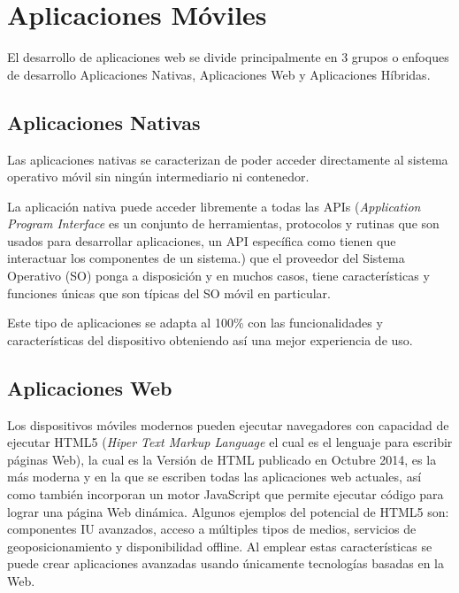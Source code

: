 \section{Aplicaciones Móviles}
\label{cha:aplicaciones_moviles}

  El desarrollo de aplicaciones web se divide principalmente en 3 grupos o enfoques de desarrollo Aplicaciones Nativas, Aplicaciones Web y Aplicaciones Híbridas.

  \subsection{Aplicaciones Nativas}
  \label{sec:aplicaciones_nativas}

  Las aplicaciones nativas se caracterizan de poder acceder directamente al sistema operativo móvil sin ningún intermediario ni contenedor.

  La aplicación nativa puede acceder libremente a todas las APIs (\emph{Application Program Interface} es un conjunto de herramientas, protocolos y rutinas que son usados para desarrollar aplicaciones, un API específica como tienen que interactuar los componentes de un sistema.) que el proveedor del Sistema Operativo (SO) ponga a disposición y en muchos casos, tiene características y funciones únicas que son típicas del SO móvil en particular.

  Este tipo de aplicaciones se adapta al 100\% con las funcionalidades y características del dispositivo obteniendo así una mejor experiencia de uso.


  \subsection{Aplicaciones Web}
  \label{sec:aplicaciones_web}

  Los dispositivos móviles modernos pueden ejecutar navegadores con capacidad de ejecutar HTML5 (\emph{Hiper Text Markup Language} el cual es el lenguaje para escribir páginas Web), la cual es la Versión de HTML publicado en Octubre 2014, es la más moderna y en la que se escriben todas las aplicaciones web actuales, así como también incorporan un motor JavaScript que permite ejecutar código para lograr una página Web dinámica. Algunos ejemplos del potencial de HTML5 son: componentes IU avanzados, acceso a múltiples tipos de medios, servicios de geoposicionamiento y disponibilidad offline. Al emplear estas características se puede crear aplicaciones avanzadas usando únicamente tecnologías basadas en la Web.\\

